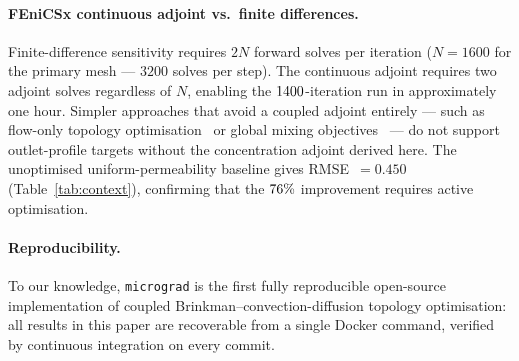 \paragraph{FEniCSx continuous adjoint vs.\ finite differences.}
Finite-difference sensitivity requires $2N$ forward solves per
iteration ($N=1600$ for the primary mesh --- $3200$ solves per step).
The continuous adjoint requires two adjoint solves regardless of $N$,
enabling the $1400$-iteration run in approximately one hour.
Simpler approaches that avoid a coupled adjoint entirely --- such as
flow-only topology optimisation~\cite{borrvall2003} or global mixing
objectives~\cite{kreissl2011} --- do not support outlet-profile
targets without the concentration adjoint derived here.
The unoptimised uniform-permeability baseline gives
RMSE~$=0.450$ (Table~\ref{tab:context}), confirming
that the $76\%$ improvement requires active optimisation.

\paragraph{Reproducibility.}
To our knowledge, \texttt{micrograd} is the first fully reproducible
open-source implementation of coupled Brinkman--convection-diffusion
topology optimisation: all results in this paper are recoverable
from a single Docker command, verified by continuous integration
on every commit.

